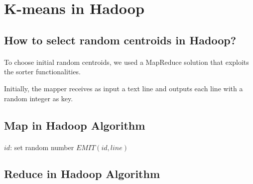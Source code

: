 \documentclass{book}
\begin{document}
    \section{K-means in Hadoop}
    \paragraph{}
    
    \subsection{How to select random centroids in Hadoop?}
    \paragraph{}

    To choose initial random centroids, we used a MapReduce solution that exploits the sorter functionalities.  

    Initially, the mapper receives as input a text line and outputs each line with a random integer as key. 

    \subsection{Map in Hadoop Algorithm}
    \paragraph{}

    \begin{algorithm}[H]
        \SetAlgoLined
        \BlankLine
        $id$: set random number\;
        $EMIT(id, line)$\;
         \caption{$MAP(line)$}
    \end{algorithm}
    
    \clearpage
    \subsection{Reduce in Hadoop Algorithm}
    \paragraph{}
\end{document}
